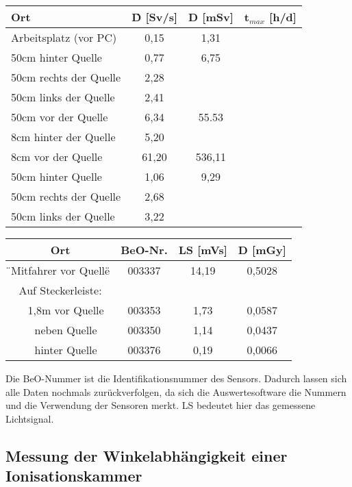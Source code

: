 	\begin{center}	

					\begin{tabular}{l|c|c|c}
								\textbf{Ort} & \textbf{\.D} [Sv/s] & \textbf{D} [mSv]  & \textbf{t$_{max}$} [h/d]\\ 
						\hline  Arbeitsplatz (vor PC) & 0,15  & 1,31   & \\ 
								50cm hinter Quelle    & 0,77  & 6,75   & \\ 
								50cm rechts der Quelle& 2,28  &        &\\ 
								50cm links der Quelle & 2,41  &        &\\ 
								50cm vor der Quelle   & 6,34  & 55.53  & \\ 
								8cm hinter der Quelle & 5,20  &        &\\ 
								8cm vor der Quelle    & 61,20 & 536,11 & \\
						\hline  50cm hinter Quelle    & 1,06  & 9,29   & \\
								50cm rechts der Quelle& 2,68  &        &\\ 
								50cm links der Quelle & 3,22  &        &\\
					\end{tabular}	
	
					\begin{tabular}{c|c|c|c}
								\textbf{Ort} & \textbf{BeO-Nr.} & \textbf{LS} [mVs] & \textbf{D} [mGy] \\
						\hline  \"{}Mitfahrer vor Quelle\" & 003337 & 14,19 & 0,5028 \\
								Auf Steckerleiste:         &        &       &        \\
								 \ \ 1,8m vor Quelle       & 003353 & 1,73  & 0,0587 \\
								 \ \ neben Quelle          & 003350 & 1,14  & 0,0437 \\
								 \ \ hinter Quelle         & 003376 & 0,19  & 0,0066 \\
						
					\end{tabular}
	\end{center}
	
Die BeO-Nummer ist die Identifikationsnummer des Sensors. Dadurch lassen sich alle Daten nochmals zurückverfolgen, da sich die Auswertesoftware die Nummern und die Verwendung der Sensoren merkt. LS bedeutet hier das gemessene Lichtsignal.
		
\subsection{Messung der Winkelabhängigkeit einer Ionisationskammer}

